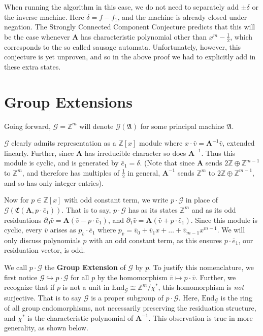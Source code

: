 \documentclass[runningheads]{llncs}
\newcommand{\G}{\mathcal{G}}
\renewcommand{\P}{\mathfrak{A}}
\newcommand{\Z}{\mathbb{Z}}
\newcommand{\2}{\textbf{2}}
\newcommand{\Am}{\textbf{A}}
\newcommand{\del}{\partial}
\newcommand{\vv}{\bar{v}}
\newcommand{\e}{\bar{e}}
\begin{document}
When running the algorithm in this case, we do not need to separately add
$\pm \delta$ or the inverse machine. Here $\delta = f - f_1$, and the machine
is already closed under negation. The Strongly Connected Component Conjecture 
predicts that this will be the case whenever $\Am$ has characteristic 
polynomial other than $x^m - \frac{1}{2}$, which corresponds to the so called 
sausage automata. Unfortunately, however, this conjecture is yet unproven,
and so in the above proof we had to explicitly add in these extra states.

\section{Group Extensions}
Going forward, $\G = \Z^m$ will denote $\G(\P)$ for some principal machine $\P$.

$\G$ clearly admits representation as a $\Z[x]$ module where 
$x \cdot \vv = \Am^{-1}\vv$, extended linearly. Further, since $\Am$ has 
irreducible character so does $\Am^{-1}$. Thus this module is cyclic, 
and is generated by $\e_1 = \delta$. 
(Note that since $\Am$ sends $2\Z \oplus \Z^{m-1}$ to $\Z^m$, and therefore
has multiples of $\frac{1}{2}$ in general, $\Am^{-1}$ sends $\Z^m$ to 
$2\Z \oplus \Z^{m-1}$, and so has only integer entries).

Now for $p \in \Z[x]$ with odd constant term, we write
$p \cdot \G$ in place of $\G(\mathfrak{C}(\Am,p \cdot \e_1))$.
That is to say, $p \cdot \G$ has as its states $\Z^m$ and as its 
odd residuations
$\del_0 \vv = \Am (\vv - p \cdot \e_1)$, and 
$\del_1 \vv = \Am (\vv + p \cdot \e_1)$.
Since this module is cyclic, every $\vv$ arises as 
$p_{\vv} \cdot \e_1$ where 
$p_{\vv} = \vv_0 + \vv_1 x + \ldots + \vv_{m-1} x^{m-1}$.
We will only discuss polynomials $p$ with an odd constant term, as 
this ensures $p \cdot \e_1$, our residuation vector, is odd.

We call $p \cdot \G$ the \textbf{Group Extension} of $\G$ by $p$.
To justify this nomenclature, we first notice 
$\G \hookrightarrow p \cdot \G$ for all $p$ by the
homomorphism $\vv \mapsto p \cdot \vv$. 
Further, we recognize that if $p$ is not a unit in 
$\text{End}_{\G} \cong \Z^m / \chi^*$, this homomorphism is \emph{not} 
surjective. That is to say $\G$ is a proper subgroup of $p \cdot \G$.
Here, $\text{End}_{\G}$ is the ring of all group endomorphisms, not 
necessarily preserving the residuation structure, and $\chi^*$ is the
characteristic polynomial of $\Am^{-1}$. 
This observation is true in more generality, as shown below.
\end{document}
